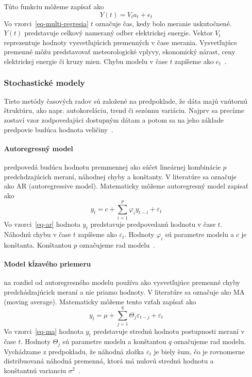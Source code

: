 \documentclass[a4paper,slovak,12pt,appendix]{article}
\begin{document}
Túto funkciu môžeme zapísať ako
\begin{equation}
  Y(t) = V_t a_t + e_t
  \label{eq-multi-regresia}
\end{equation}
Vo vzorci~\ref{eq-multi-regresia} $t$ označuje čas, kedy bolo meranie
uskutočnené. $Y(t)$ predstavuje celkový nameraný odber elektrickej energie.
Vektor $V_t$ reprezentuje hodnoty vysvetľujúcich premenných v čase merania.
Vysvetľujúce premenné môžu predstavovať meteorologické vplyvy, ekonomický
nárast, ceny elektrickej energie či kruzy mien. Chybu modelu v čase $t$
zapíšeme ako $e_t$~\cite{KumarSingh2013, Mahalakshmi2016}.


\subsubsection{Stochastické modely}
Tieto metódy časových radov sú založené na predpoklade, že dáta majú vnútornú
štruktúru, ako napr. autokoreláciu, trend či sezónnu variáciu. Najprv sa
precízne zostaví vzor zodpovedajúci dostupným dátam a potom sa na jeho základe
predpovie budúca hodnota veličiny~\cite{KumarSingh2013}.

\paragraph{Autoregresný model} predpovedá budúcu hodnotu premmennej ako súčet
lineárnej kombinácie $p$ predchdzajúcich meraní, náhodnej chyby a konštanty.
V literatúre sa označuje ako AR (autoregressive model). Matematicky môžeme
autoregresný model zapisať ako
\begin{equation}
  y_t = c + \sum_{i=1}^{p} \varphi_i y_{t-i} + \varepsilon_t
  \label{eq-ar}
\end{equation}
Vo vzorci~\ref{eq-ar} hodnota $y_t$ predstavuje predpovedanú hodnotu
v čase $t$. Náhodnú chybu v čase $t$ zapíšeme ako $\varepsilon_t$. Hodnoty
$\varphi_i$ sú parametre modelu a $c$ je konštanta. Konštantou $p$ označujeme
rad modelu~\cite{Agrawal2013}.

\paragraph{Model kĺzavého priemeru} na rozdiel od autoregresného modelu používa
ako vysvetľujúce premenné chyby predchádzajúcich meraní a nie priamo hodnoty.
V literatúre sa označuje ako MA (moving average). Matematicky môžeme tento
vzťah zapísať ako
\begin{equation}
  y_t = \mu + \sum_{j=1}^{q} \Theta_j \varepsilon_{t-j} + \varepsilon_t
  \label{eq-ma}
\end{equation}
Vo vzorci~\ref{eq-ma} hodnota $y_t$ predstavuje strednú hodnotu
postupnosti meraní v čase $t$. Hodnoty $\Theta_j$ sú parametre modelu
a konštantou $q$ označujeme rad modelu. Vychádzame z predpokladu, že náhodná
zložka $\varepsilon_t$ je biely šum, čo je rovnomerne distribuovaná náhodná
premenná, ktorá má nulovú strednú hodnotu a konštantnú varianciu
$\sigma^2$~\cite{Agrawal2013}.
\end{document}
